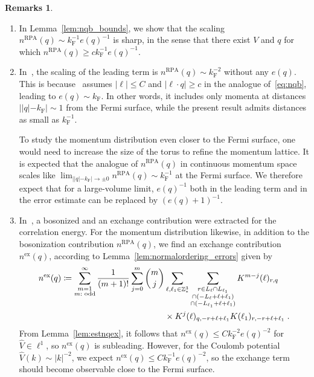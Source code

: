 \documentclass[12pt,a4paper]{article}
\numberwithin{equation}{section}
\newcommand{\1}{\mathbb{I}}
\newcommand{\ex}{\mathrm{ex}}
\newcommand{\F}{\mathrm{F}}
\newcommand{\RPA}{\mathrm{RPA}}
\newcommand{\Z}{\mathbb{Z}}
\theoremstyle{plain}
\theoremstyle{definition}
\newtheorem*{remarks}{Remarks}
\theoremstyle{remark}
\theoremstyle{plain}
\theoremstyle{definition}
\theoremstyle{remark}
\begin{document}
\begin{remarks}
\begin{enumerate}

\item In Lemma~\ref{lem:nqb_bounds}, we show that the scaling $ n^{\RPA}(q) \sim k_{\F}^{-1} e(q)^{-1} $ is sharp, in the sense that there exist $ V $ and $ q $ for which $ n^{\RPA}(q) \ge c k_{\F}^{-1} e(q)^{-1} $. \todo{Make sure that $ n^{\RPA}(q) \ge c k_{\F}^{-1} e(q)^{-1} $ is true.}

\item In~\cite{BL25}, the scaling of the leading term is $ n^{\RPA}(q) \sim k_{\F}^{-2} $ without any $ e(q) $. This is because~\cite{BL25} assumes $ |\ell| \le C $ and $ |\ell \cdot q| \ge c $ in the analogue of~\eqref{eq:nqb}, leading to $ e(q) \sim k_{\F} $. In other words, it includes only momenta at distances $ ||q|-k_{\F}| \sim 1 $ from the Fermi surface, while the present result admits distances as small as $ k_{\F}^{-1} $.

To study the momentum distribution even closer to the Fermi surface, one would need to increase the size of the torus to refine the momentum lattice. It is expected \cite{DV60} that the analogue of $ n^{\RPA}(q) $ in continuous momentum space scales like $ \lim_{||q|-k_{\F}| \to \pm 0} n^{\RPA}(q) \sim k_{\F}^{-1} $ at the Fermi surface. We therefore expect that for a large-volume limit, $ e(q)^{-1} $ both in the leading term and in the error estimate can be replaced by $ (e(q)+1)^{-1} $.


\item In~\cite{CHN23,CHN24}, a bosonized and an exchange contribution were extracted for the correlation energy. For the momentum distribution likewise, in addition to the bosonization contribution $ n^{\RPA}(q) $, we find an exchange contribution $ n^{\ex}(q) $, according to Lemma~\ref{lem:normalordering_errors} given by
\begin{equation} \label{eq:nqex}
\begin{split}
	n^{\ex}(q)
	\coloneq \sum_{\substack{m=1\\m:\textnormal{ odd}}}^\infty \frac{1}{(m+1)!} \sum_{j=0}^m {{m} \choose {j}}
		& \sum_{\ell,\ell_1 \in \Z^3_*}\sum_{\substack{r\in L_{\ell} \cap L_{\ell_1}\\ \cap (-L_{\ell}+\ell+\ell_1) \\ \cap (-L_{\ell_1}+\ell+\ell_1 )}}
		K^{m-j}(\ell)_{r,q} \\
		& \times
		K^j(\ell)_{q,-r+\ell+\ell_1}
		K(\ell_1)_{r,-r+\ell+\ell_1} \;.
\end{split}
\end{equation}
From Lemma~\ref{lem:estnqex}, it follows that $ n^{\ex}(q) \le C k_{\F}^{-2} e(q)^{-2} $ for $ \hat{V} \in \ell^1 $, so $ n^{\ex}(q) $ is subleading. However, for the Coulomb potential $ \hat{V}(k) \sim |k|^{-2} $, we expect $ n^{\ex}(q) \le C k_{\F}^{-1} e(q)^{-2} $, so the exchange term should become observable close to the Fermi surface.


\end{enumerate}
\end{remarks}
\end{document}
